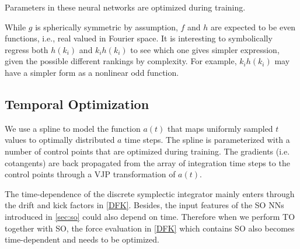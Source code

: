\documentclass[usenatbib]{mnras}
\newcommand{\YL}[1]{\textcolor{Bittersweet}{#1}}
\begin{document}
Parameters in these neural networks are optimized during training.

\YL{While $g$ is spherically symmetric by assumption, $f$ and $h$ are
expected to be even functions, i.e., real valued in Fourier space.
It is interesting to symbolically regress both $h(k_i)$ and $k_i h(k_i)$
to see which one gives simpler expression, given the possible different
rankings by complexity.
For example, $k_i h(k_i)$ may have a simpler form as a nonlinear odd
function.}


\subsection{Temporal Optimization}
\label{sec:to}

We use a spline to model the function $a(t)$ that maps uniformly sampled $t$
values to optimally distributed $a$ time steps.
The spline is parameterized with a number of control points that are optimized
during training.
The gradients (i.e. cotangents) are back propagated from the array of
integration time steps to the control points through a VJP transformation of
$a(t)$.

The time-dependence of the discrete symplectic integrator mainly enters through
the drift and kick factors in \eqref{DFK}.
Besides, the input features of the SO NNs introduced in \autoref{sec:so} could
also depend on time.
Therefore when we perform TO together with SO, the force evaluation in
\eqref{DFK} which contains SO also becomes time-dependent and needs to be
optimized.
\end{document}
